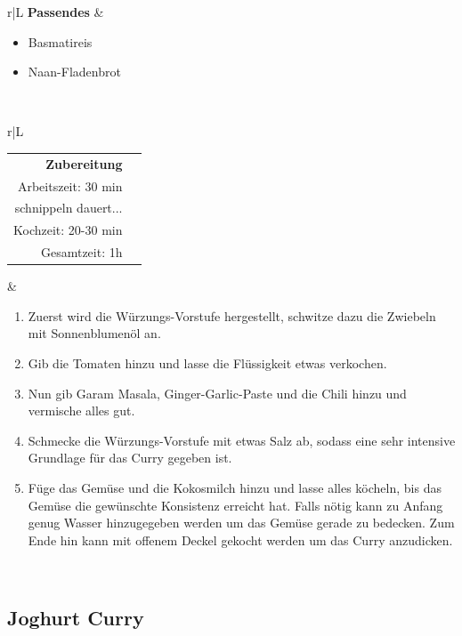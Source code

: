 \documentclass[a4paper, 12pt]{scrbook} 								%
\numberwithin{equation}{section} 									%
\begin{document}
\begin{tabularx}{\textwidth}{r|L}
				\textbf{Passendes}		&	\begin{itemize}[]
												\item Basmatireis
												\item Naan-Fladenbrot
											\end{itemize}	\\
			\end{tabularx}
			\newpage
			\begin{tabularx}{\textwidth}{r|L}	


				\begin{tabular}[t]{rr}
					\textbf{Zubereitung}	\\
					Arbeitszeit: 30 min \\ 
					schnippeln dauert...	\\
					Kochzeit: 20-30 min \\
					Gesamtzeit:	1h 		\\
				\end{tabular}			&	\begin{enumerate}
												\item Zuerst wird die Würzungs-Vorstufe hergestellt, schwitze dazu die Zwiebeln mit Sonnenblumenöl an.
												\item Gib die Tomaten hinzu und lasse die Flüssigkeit etwas verkochen.
												\item Nun gib Garam Masala, Ginger-Garlic-Paste und die Chili hinzu und vermische alles gut.
												\item Schmecke die Würzungs-Vorstufe mit etwas Salz ab, sodass eine sehr intensive Grundlage für das Curry gegeben ist.
												\item Füge das Gemüse und die Kokosmilch hinzu und lasse alles köcheln, bis das Gemüse die gewünschte Konsistenz erreicht hat. Falls nötig kann zu Anfang genug Wasser hinzugegeben werden um das Gemüse gerade zu bedecken. Zum Ende hin kann mit offenem Deckel gekocht werden um das Curry anzudicken.
											\end{enumerate}	\\
			\end{tabularx}
			\newpage


			\subsection{Joghurt Curry}	\label{joghurt_curry}
\end{document}
